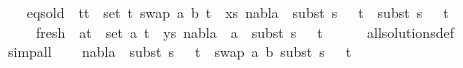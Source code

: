 \begin{isabellebody}
\ \ \isamarkupfalse%
\ eqs{\isacharunderscore}{\kern0pt}old{\isacharcolon}{\kern0pt}\ {\isachardoublequoteopen}{\isasymforall}\ {\isacharparenleft}{\kern0pt}t{}{\isacharcomma}{\kern0pt}t{}{\isacharparenright}{\kern0pt}\ {\isasymin}\ set\ {\isacharparenleft}{\kern0pt}{\isacharparenleft}{\kern0pt}t{}{\isacharcomma}{\kern0pt}\ swap\ {\isacharbrackleft}{\kern0pt}{\isacharparenleft}{\kern0pt}a{\isacharcomma}{\kern0pt}\ b{\isacharparenright}{\kern0pt}{\isacharbrackright}{\kern0pt}\ t{}{\isacharparenright}{\kern0pt}\ {\isacharhash}{\kern0pt}\ xs{\isacharparenright}{\kern0pt}{\isachardot}{\kern0pt}\ nabla{}\ {\isasymturnstile}\ subst\ {\isacharparenleft}{\kern0pt}s{}\ {\isasymbullet}\ {\isacharbrackleft}{\kern0pt}{\isacharbrackright}{\kern0pt}{\isacharparenright}{\kern0pt}\ t{}\ {\isasymapprox}\ subst\ {\isacharparenleft}{\kern0pt}s{}\ {\isasymbullet}\ {\isacharbrackleft}{\kern0pt}{\isacharbrackright}{\kern0pt}{\isacharparenright}{\kern0pt}\ t{}{\isachardoublequoteclose}\ \isanewline
\ \ \ \ \ fresh{\isacharcolon}{\kern0pt}\ {\isachardoublequoteopen}{\isasymforall}\ {\isacharparenleft}{\kern0pt}a{\isacharcomma}{\kern0pt}t{\isacharparenright}{\kern0pt}\ {\isasymin}\ set\ {\isacharparenleft}{\kern0pt}{\isacharparenleft}{\kern0pt}a{\isacharcomma}{\kern0pt}\ t{}{\isacharparenright}{\kern0pt}\ {\isacharhash}{\kern0pt}\ ys{\isacharparenright}{\kern0pt}{\isachardot}{\kern0pt}\ nabla{}\ {\isasymturnstile}\ a\ {\isasymsharp}\ subst\ {\isacharparenleft}{\kern0pt}s{}\ {\isasymbullet}\ {\isacharbrackleft}{\kern0pt}{\isacharbrackright}{\kern0pt}{\isacharparenright}{\kern0pt}\ t{\isachardoublequoteclose}\isanewline
\ \ \ \ \isamarkupfalse%
\ all{\isacharunderscore}{\kern0pt}solutions{\isacharunderscore}{\kern0pt}def\ \isamarkupfalse%
\ simp{\isacharunderscore}{\kern0pt}all\isanewline
\ \ \isamarkupfalse%
\ {\isachardoublequoteopen}nabla{}\ {\isasymturnstile}\ subst\ {\isacharparenleft}{\kern0pt}s{}\ {\isasymbullet}\ {\isacharbrackleft}{\kern0pt}{\isacharbrackright}{\kern0pt}{\isacharparenright}{\kern0pt}\ t{}\ {\isasymapprox}\ swap\ {\isacharbrackleft}{\kern0pt}{\isacharparenleft}{\kern0pt}a{\isacharcomma}{\kern0pt}\ b{\isacharparenright}{\kern0pt}{\isacharbrackright}{\kern0pt}\ {\isacharparenleft}{\kern0pt}subst\ {\isacharparenleft}{\kern0pt}s{}\ {\isasymbullet}\ {\isacharbrackleft}{\kern0pt}{\isacharbrackright}{\kern0pt}{\isacharparenright}{\kern0pt}\ t{}{\isacharparenright}{\kern0pt}{\isachardoublequoteclose}\isanewline

\end{isabellebody}
